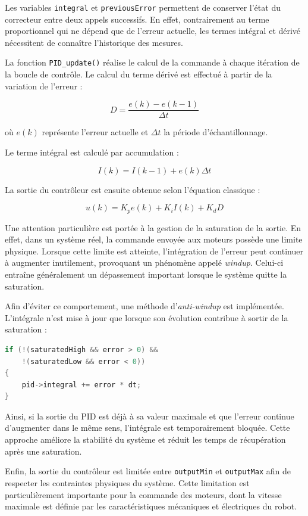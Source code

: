 Les variables \texttt{integral} et \texttt{previousError} permettent de conserver l'état du correcteur entre deux appels successifs. En effet, contrairement au terme proportionnel qui ne dépend que de l'erreur actuelle, les termes intégral et dérivé nécessitent de connaître l'historique des mesures.

La fonction \texttt{PID\_update()} réalise le calcul de la commande à chaque itération de la boucle de contrôle. Le calcul du terme dérivé est effectué à partir de la variation de l'erreur :

\[
D = \frac{e(k)-e(k-1)}{\Delta t}
\]

où $e(k)$ représente l'erreur actuelle et $\Delta t$ la période d'échantillonnage.

Le terme intégral est calculé par accumulation :

\[
I(k)=I(k-1)+e(k)\Delta t
\]

La sortie du contrôleur est ensuite obtenue selon l'équation classique :

\[
u(k)=K_p e(k)+K_i I(k)+K_d D
\]

Une attention particulière est portée à la gestion de la saturation de la sortie. En effet, dans un système réel, la commande envoyée aux moteurs possède une limite physique. Lorsque cette limite est atteinte, l'intégration de l'erreur peut continuer à augmenter inutilement, provoquant un phénomène appelé \textit{windup}. Celui-ci entraîne généralement un dépassement important lorsque le système quitte la saturation.

Afin d'éviter ce comportement, une méthode d'\textit{anti-windup} est implémentée. L'intégrale n'est mise à jour que lorsque son évolution contribue à sortir de la saturation :

\begin{lstlisting}[language=C++]
if (!(saturatedHigh && error > 0) &&
    !(saturatedLow && error < 0))
{
    pid->integral += error * dt;
}
\end{lstlisting}

Ainsi, si la sortie du PID est déjà à sa valeur maximale et que l'erreur continue d'augmenter dans le même sens, l'intégrale est temporairement bloquée. Cette approche améliore la stabilité du système et réduit les temps de récupération après une saturation.

Enfin, la sortie du contrôleur est limitée entre \texttt{outputMin} et \texttt{outputMax} afin de respecter les contraintes physiques du système. Cette limitation est particulièrement importante pour la commande des moteurs, dont la vitesse maximale est définie par les caractéristiques mécaniques et électriques du robot.

